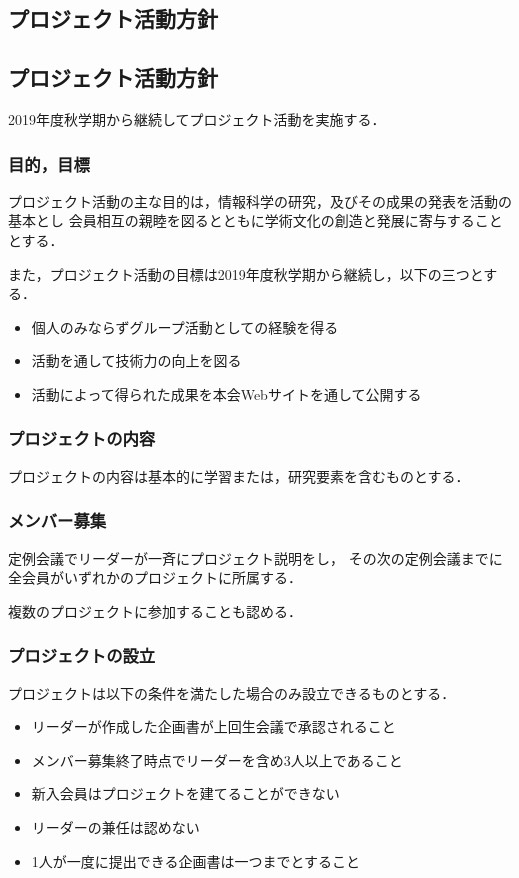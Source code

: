 \subsection*{プロジェクト活動方針}

\subsection*{プロジェクト活動方針}
2019年度秋学期から継続してプロジェクト活動を実施する．

\subsubsection*{目的，目標}
プロジェクト活動の主な目的は，情報科学の研究，及びその成果の発表を活動の基本とし
会員相互の親睦を図るとともに学術文化の創造と発展に寄与することとする．

また，プロジェクト活動の目標は2019年度秋学期から継続し，以下の三つとする．

\begin{itemize}
\item 個人のみならずグループ活動としての経験を得る
\item 活動を通して技術力の向上を図る
\item 活動によって得られた成果を本会Webサイトを通して公開する
\end{itemize}


\subsubsection*{プロジェクトの内容}
プロジェクトの内容は基本的に学習または，研究要素を含むものとする．

\subsubsection*{メンバー募集}
定例会議でリーダーが一斉にプロジェクト説明をし，
その次の定例会議までに全会員がいずれかのプロジェクトに所属する．

複数のプロジェクトに参加することも認める．

\subsubsection*{プロジェクトの設立}
プロジェクトは以下の条件を満たした場合のみ設立できるものとする．

\begin{itemize}
\item リーダーが作成した企画書が上回生会議で承認されること
\item メンバー募集終了時点でリーダーを含め3人以上であること
\item 新入会員はプロジェクトを建てることができない
\item リーダーの兼任は認めない
\item 1人が一度に提出できる企画書は一つまでとすること
\end{itemize}

